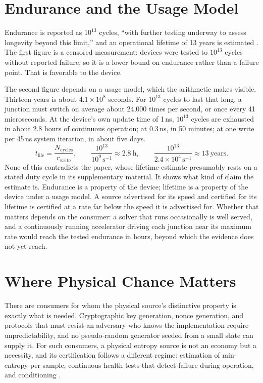 \documentclass[11pt]{article}
\theoremstyle{definition}
\theoremstyle{remark}
\begin{document}
\section{Endurance and the Usage Model}

Endurance is reported as $10^{13}$ cycles, ``with further testing underway to assess longevity beyond this limit,'' and an operational lifetime of 13 years is estimated \cite{li2026}. The first figure is a censored measurement: devices were tested to $10^{13}$ cycles without reported failure, so it is a lower bound on endurance rather than a failure point. That is favorable to the device.

The second figure depends on a usage model, which the arithmetic makes visible. Thirteen years is about $4.1 \times 10^8$ seconds. For $10^{13}$ cycles to last that long, a junction must switch on average about 24,000 times per second, or once every 41 microseconds. At the device's own update time of 1\,ns, $10^{13}$ cycles are exhausted in about 2.8 hours of continuous operation; at 0.3\,ns, in 50 minutes; at one write per 45\,ns system iteration, in about five days.
\begin{equation}
t_{\mathrm{life}} = \frac{N_{\mathrm{cycles}}}{r_{\mathrm{write}}}, \qquad \frac{10^{13}}{10^{9}\,\mathrm{s}^{-1}} \approx 2.8\ \mathrm{h}, \qquad \frac{10^{13}}{2.4 \times 10^{4}\,\mathrm{s}^{-1}} \approx 13\ \mathrm{years}.
\end{equation}
None of this contradicts the paper, whose lifetime estimate presumably rests on a stated duty cycle in its supplementary material. It shows what kind of claim the estimate is. Endurance is a property of the device; lifetime is a property of the device under a usage model. A source advertised for its speed and certified for its lifetime is certified at a rate far below the speed it is advertised for. Whether that matters depends on the consumer: a solver that runs occasionally is well served, and a continuously running accelerator driving each junction near its maximum rate would reach the tested endurance in hours, beyond which the evidence does not yet reach.

\section{Where Physical Chance Matters}

There are consumers for whom the physical source's distinctive property is exactly what is needed. Cryptographic key generation, nonce generation, and protocols that must resist an adversary who knows the implementation require unpredictability, and no pseudo-random generator seeded from a small state can supply it. For such consumers, a physical entropy source is not an economy but a necessity, and its certification follows a different regime: estimation of min-entropy per sample, continuous health tests that detect failure during operation, and conditioning \cite{nist80090b}.
\end{document}
